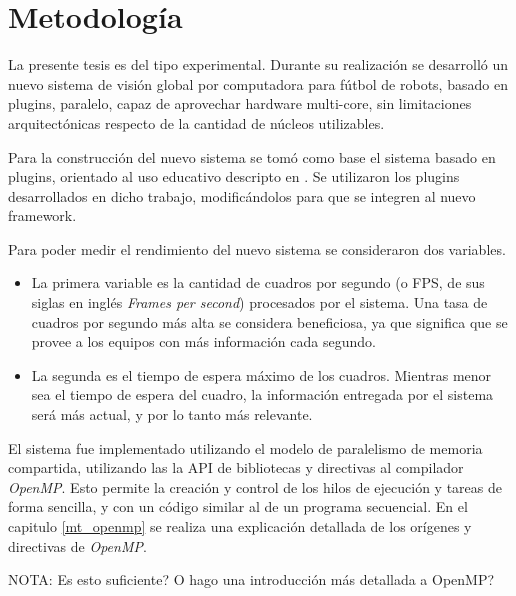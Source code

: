 
\section{Metodología}

La presente tesis es del tipo experimental. Durante su realización se desarrolló
un nuevo sistema de visión global por computadora para fútbol de robots, basado
en plugins, paralelo, capaz de aprovechar hardware multi-core, sin limitaciones
arquitectónicas respecto de la cantidad de núcleos utilizables.

Para la construcción del nuevo sistema se tomó como base el sistema basado en
plugins, orientado al uso educativo descripto en \cite{torres2014}. Se
utilizaron los plugins desarrollados en dicho trabajo, modificándolos para que
se integren al nuevo framework.

Para poder medir el rendimiento del nuevo sistema se consideraron dos variables.

\begin {itemize}

	\item	La primera variable es la cantidad de cuadros por segundo (o
		FPS, de sus siglas en inglés \emph{Frames per second})
		procesados por el sistema. Una tasa de cuadros por segundo más
		alta se considera beneficiosa, ya que significa que se provee a
		los equipos con más información cada segundo.

	\item	La segunda es el tiempo de espera máximo de los cuadros.
		Mientras menor sea el tiempo de espera del cuadro, la
		información entregada por el sistema será más actual, y por lo
		tanto más relevante.

\end {itemize}

El sistema fue implementado utilizando el modelo de paralelismo de memoria
compartida, utilizando las la API de bibliotecas y directivas al compilador
\emph{OpenMP}. Esto permite la creación y control de los hilos de ejecución
y tareas de forma sencilla, y con un código similar al de un programa
secuencial. En el capitulo \ref{mt_openmp} se realiza una explicación detallada
de los orígenes y directivas de \emph{OpenMP}.

NOTA: Es esto suficiente? O hago una introducción más detallada a OpenMP?
